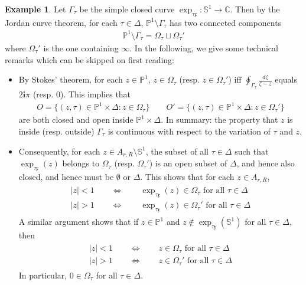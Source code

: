 \documentclass[12pt,a4paper,notitlepage]{article}
\theoremstyle{definition}
\newtheorem{eg}[df]{Example}
\theoremstyle{plain}
\newcommand{\xk}{\mathfrak x}
\newcommand{\im}{\mathbf{i}}
\newcommand{\Cbb}{\mathbb C}
\newcommand{\Pbb}{\mathbb P}
\newcommand{\Sbb}{{\mathbb S}}
\numberwithin{equation}{section}
\begin{document}
\begin{eg}
Let $\Gamma_\tau$ be the simple closed curve $\exp_{\tau\xk}:\Sbb^1\rightarrow\Cbb$. Then by the Jordan curve theorem, for each $\tau\in\Delta$, $\Pbb^1\setminus\Gamma_\tau$ has two connected components
\begin{align*}
\Pbb^1\setminus\Gamma_\tau=\Omega_\tau\sqcup\Omega_\tau' 
\end{align*}
where $\Omega_\tau'$ is the one containing $\infty$. In the following, we give some technical remarks which can be skipped on first reading:
\begin{itemize}
\item By Stokes' theorem, for each $z\in\Pbb^1$, $z\in \Omega_\tau$ (resp. $z\in\Omega_\tau'$) iff $\oint_{\Gamma_\tau}\frac {d\zeta}{\zeta-z}$ equals $2\im\pi$ (resp. 0). This implies that
\begin{align*}
O=\{(z,\tau)\in\Pbb^1\times\Delta:z\in\Omega_\tau\}\qquad O'=\{(z,\tau)\in\Pbb^1\times\Delta:z\in\Omega_\tau'\}
\end{align*}
are both closed and open inside $\Pbb^1\times\Delta$. In summary: the property that $z$ is inside (resp. outside) $\Gamma_\tau$ is continuous with respect to the variation of $\tau$ and $z$.
\item Consequently, for each $z\in A_{r,R}\setminus\Sbb^1$, the subset of all $\tau\in\Delta$ such that  $\exp_{\tau\xk}(z)$ belongs to $\Omega_\tau$ (resp. $\Omega_\tau'$) is an open subset of $\Delta$, and hence also closed, and hence must be $\emptyset$ or $\Delta$. This shows that for each $z\in A_{r,R}$,
\begin{gather}\label{eq208}
\begin{gathered}
|z|<1\qquad\Longleftrightarrow\qquad\exp_{\tau\xk}(z)\in\Omega_\tau\text{ for all }\tau\in \Delta\\
|z|>1\qquad\Longleftrightarrow\qquad\exp_{\tau\xk}(z)\in\Omega_\tau'\text{ for all }\tau\in \Delta
\end{gathered}
\end{gather}
A similar argument shows that if $z\in\Pbb^1$ and $z\notin\exp_{\tau\xk}(\Sbb^1)$ for all $\tau\in\Delta$, then
\begin{gather}\label{eq209}
\begin{gathered}
|z|<1\qquad\Longleftrightarrow\qquad z\in\Omega_\tau\text{ for all }\tau\in \Delta\\
|z|>1\qquad\Longleftrightarrow\qquad z\in\Omega_\tau'\text{ for all }\tau\in \Delta
\end{gathered}
\end{gather}
In particular, $0\in\Omega_\tau$ for all $\tau\in\Delta$.
\end{itemize}


\end{eg}
\end{document}
